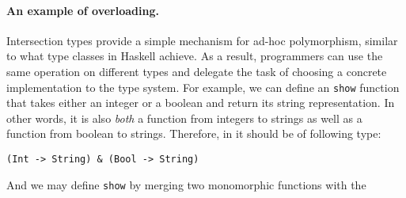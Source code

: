 \paragraph{An example of overloading.} Intersection types provide a simple mechanism for
ad-hoc polymorphism, similar to what type classes in Haskell achieve. As a
result, programmers can use the same operation on different types and delegate
the task of choosing a concrete implementation to the type system. For example,
we can define an \lstinline{show} function that takes either an integer or a
boolean and return its string representation. In other words, it is also
\emph{both} a function from integers to strings as well as a function from
boolean to strings. Therefore, in \name it should be of following type:
\begin{lstlisting}
(Int -> String) & (Bool -> String)
\end{lstlisting}
And we may define \lstinline{show} by merging two monomorphic functions with the
